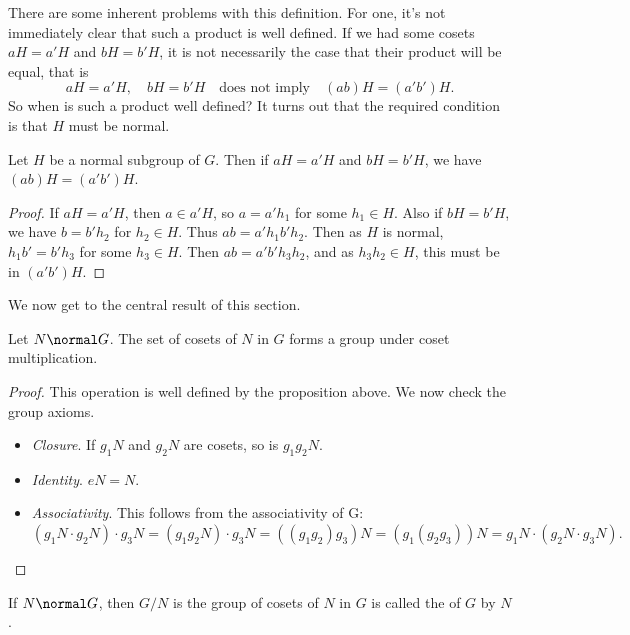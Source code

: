 There are some inherent problems with this definition. For one, it's not immediately clear that such a product is well defined.
If we had some cosets $aH = a'H$ and $bH = b'H$, it is not necessarily the case that their product will be equal, that is
$$
aH = a'H, \quad bH = b'H \quad \text{does not imply} \quad (ab)H = (a'b')H.
$$
So when is such a product well defined? It turns out that the required condition is that $H$ must be normal.

\begin{proposition}
	Let $H$ be a normal subgroup of $G$. Then if $aH = a'H$ and $bH = b'H$, we have $(ab)H = (a'b')H$.
\end{proposition}
\begin{proof}
	If $aH = a'H$, then $a \in a'H$, so $a = a' h_1$ for some $h_1 \in H$. Also if $bH = b'H$, we have $b = b' h_2$ for $h_2 \in H$. Thus
	$ab = a' h_1 b' h_2 $. Then as $H$ is normal,  $h_1 b' = b' h_3$ for some $h_3 \in H$. Then
	$ab = a' b' h_3 h_2$, and as $h_3 h_2 \in H$, this must be in $(a'b')H$.
\end{proof}

We now get to the central result of this section.

\begin{proposition}
	Let $N \normal G$. The set of cosets of $N$ in $G$ forms a group under coset multiplication.
\end{proposition}
\begin{proof}
	This operation is well defined by the proposition above. We now check the group axioms.
	\begin{itemize}
		\item \emph{Closure}. If $g_1N$ and $g_2 N$ are cosets, so is $g_1 g_2 N$.
		\item \emph{Identity}. $eN = N$.
		\item \emph{Associativity}. This follows from the associativity of G:
		$
		(g_1 N \cdot g_2 N) \cdot g_3 N = (g_1 g_2 N) \cdot g_3 N = ((g_1 g_2) g_3) N = (g_1 (g_2 g_3))N = g_1 N \cdot (g_2 N \cdot g_3 N).
		$
 	\end{itemize}
\end{proof}

\begin{definition}
	If $N \normal G$, then $G/N$ is the group of cosets of $N$ in $G$ is called the  of $G$ by $N$.
\end{definition}

